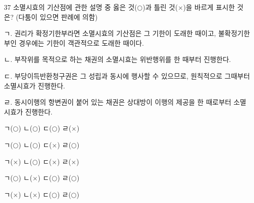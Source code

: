 \begin{question}{37}
소멸시효의 기산점에 관한 설명 중 옳은 것($\bigcirc$)과 틀린 것($\times$)을 바르게 표시한 것은? (다툼이 있으면 판례에 의함)
\begin{framedtext}
ㄱ. 권리가 확정기한부라면 소멸시효의 기산점은 그 기한이 도래한 때이고, 불확정기한부인 경우에는 기한이 객관적으로 도래한 때이다. \par
ㄴ. 부작위를 목적으로 하는 채권의 소멸시효는 위반행위를 한 때부터 진행한다. \par
ㄷ. 부당이득반환청구권은 그 성립과 동시에 행사할 수 있으므로, 원칙적으로 그때부터 소멸시효가 진행한다. \par
ㄹ. 동시이행의 항변권이 붙어 있는 채권은 상대방이 이행의 제공을 한 때로부터 소멸시효가 진행한다. \par
\end{framedtext}
\begin{choices}
  \item ㄱ($\bigcirc$) ㄴ($\bigcirc$) ㄷ($\bigcirc$) ㄹ($\times$)
  \item ㄱ($\bigcirc$) ㄴ($\bigcirc$) ㄷ($\times$) ㄹ($\bigcirc$)
  \item ㄱ($\times$) ㄴ($\bigcirc$) ㄷ($\times$) ㄹ($\times$)
  \item ㄱ($\bigcirc$) ㄴ($\times$) ㄷ($\bigcirc$) ㄹ($\bigcirc$)
  \item ㄱ($\times$) ㄴ($\times$) ㄷ($\bigcirc$) ㄹ($\bigcirc$)
\end{choices}
\end{question}
